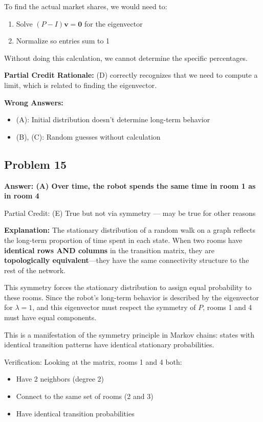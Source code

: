 \documentclass[12pt]{amsart}
\newcommand{\correct}[1]{{\color{correctgreen}\textbf{#1}}}
\newcommand{\partcred}[1]{{\color{partialblue}#1}}
\begin{document}
To find the actual market shares, we would need to:
\begin{enumerate}
\item Solve $(P - I)\mathbf{v} = \mathbf{0}$ for the eigenvector
\item Normalize so entries sum to 1
\end{enumerate}

Without doing this calculation, we cannot determine the specific percentages.

\textbf{Partial Credit Rationale:} (D) correctly recognizes that we need to compute a limit, which is related to finding the eigenvector.

\textbf{Wrong Answers:}
\begin{itemize}
\item (A): Initial distribution doesn't determine long-term behavior
\item (B), (C): Random guesses without calculation
\end{itemize}

\subsection*{Problem 15}
\correct{Answer: (A) Over time, the robot spends the same time in room 1 as in room 4}

\partcred{Partial Credit: (E) True but not via symmetry — may be true for other reasons}

\textbf{Explanation:} The stationary distribution of a random walk on a graph reflects the long-term proportion of time spent in each state. When two rooms have \textbf{identical rows AND columns} in the transition matrix, they are \textbf{topologically equivalent}—they have the same connectivity structure to the rest of the network.

This symmetry forces the stationary distribution to assign equal probability to these rooms. Since the robot's long-term behavior is described by the eigenvector for $\lambda = 1$, and this eigenvector must respect the symmetry of $P$, rooms 1 and 4 must have equal components.

This is a manifestation of the symmetry principle in Markov chains: states with identical transition patterns have identical stationary probabilities.

Verification: Looking at the matrix, rooms 1 and 4 both:
\begin{itemize}
\item Have 2 neighbors (degree 2)
\item Connect to the same set of rooms (2 and 3)
\item Have identical transition probabilities
\end{itemize}
\end{document}
